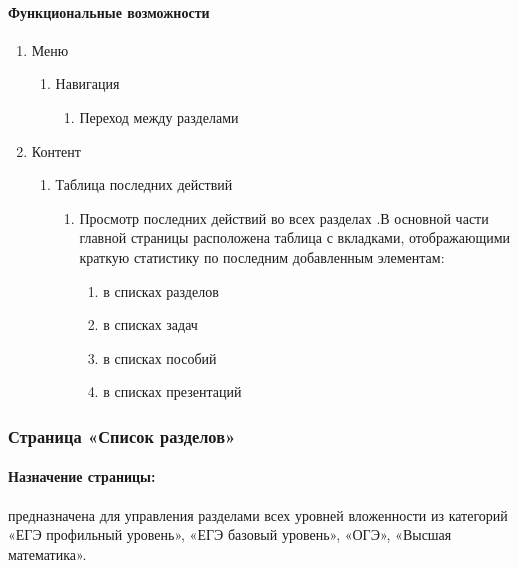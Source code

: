 \paragraph{Функциональные возможности}
\begin{enumerate}
  \item Меню
  \begin{enumerate}
    \item Навигация
    \begin{enumerate}
      \item Переход между разделами
    \end{enumerate}
  \end{enumerate}

  \item Контент
  \begin{enumerate}
    \item Таблица последних действий
    \begin{enumerate}
      \item Просмотр последних действий во всех разделах .В основной части главной страницы расположена таблица с вкладками, отображающими краткую статистику по последним добавленным элементам:
      \begin{enumerate}
        \item  в списках разделов
        \item  в списках задач
        \item  в списках пособий
        \item  в списках презентаций
      \end{enumerate}
    \end{enumerate}
  \end{enumerate}
\end{enumerate}

\subsubsection{Страница «Список разделов»}
\paragraph{Назначение страницы:} предназначена для управления разделами всех уровней вложенности из категорий «ЕГЭ профильный уровень», «ЕГЭ базовый уровень», «ОГЭ», «Высшая математика».

